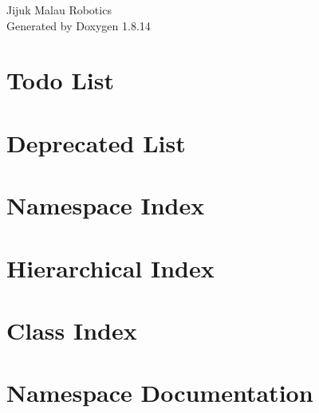 \documentclass[twoside]{book}
\newcommand{\+}{\discretionary{\mbox{\scriptsize$\hookleftarrow$}}{}{}}
\newcommand{\clearemptydoublepage}{%
  \newpage{\pagestyle{empty}\cleardoublepage}%
}
\begin{document}
\hypersetup{pageanchor=false,
             bookmarksnumbered=true,
             pdfencoding=unicode
            }
\begin{titlepage}
\vspace*{7cm}
\begin{center}%
{\Large Jijuk Malau Robotics }\\
\vspace*{1cm}
{\large Generated by Doxygen 1.8.14}\\
\end{center}
\end{titlepage}
\clearemptydoublepage
{}
\tableofcontents
\clearemptydoublepage
{}
\hypersetup{pageanchor=true}

\chapter{Todo List}
\label{todo}

\chapter{Deprecated List}
\label{deprecated}

\chapter{Namespace Index}

\chapter{Hierarchical Index}

\chapter{Class Index}

\chapter{Namespace Documentation}




\end{document}
